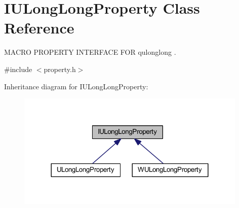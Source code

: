 \hypertarget{class_i_u_long_long_property}{\section{I\-U\-Long\-Long\-Property Class Reference}
\label{class_i_u_long_long_property}
}


M\-A\-C\-R\-O P\-R\-O\-P\-E\-R\-T\-Y I\-N\-T\-E\-R\-F\-A\-C\-E F\-O\-R qulonglong .  




{\ttfamily \#include $<$property.\-h$>$}



Inheritance diagram for I\-U\-Long\-Long\-Property\-:
\nopagebreak
\begin{figure}[H]
\begin{center}
\leavevmode
\includegraphics[width=312pt]{class_i_u_long_long_property__inherit__graph}
\end{center}
\end{figure}
